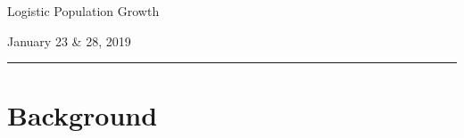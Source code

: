 \documentclass[color=usenames,dvipsnames]{beamer}\usepackage[]{graphicx}\usepackage[]{color}
\begin{document}
\setlength\fboxsep{0pt}




{
\begin{frame}[plain]
  \vspace{-3.0cm}
  \begin{center}
    {\huge Logistic Population Growth } \par
    {\large January 23 \& 28, 2019}
  \end{center}
  \begin{adjustwidth}{-1cm}{-1cm}
    \rule[-7mm]{\paperwidth}{1pt}
  \end{adjustwidth}
\end{frame}
}





\section{Background}
\end{document}
